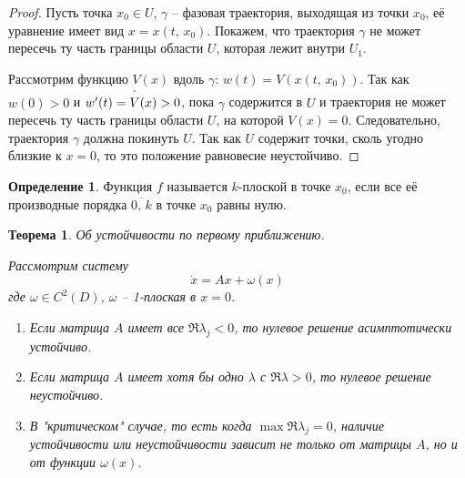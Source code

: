 \documentclass[a4paper,12pt]{article}
\theoremstyle{plain}
\newtheorem{theorem}{Теорема}[section]
\theoremstyle{definition}
\newtheorem{definition}{Определение}[section]
\theoremstyle{remark}
\begin{document}
\begin{proof}
	Пусть точка $x_0 \in  U,\, \gamma$ -- фазовая траектория, выходящая из точки $x_0$, её уравнение имеет вид $x = x(t,\, x_0)$.
	Покажем, что траектория $\gamma$ не может пересечь ту часть границы области $U$, которая лежит внутри $U_1$.

	Рассмотрим функцию $V(x)$ вдоль $\gamma$: $w(t) = V(x(t,\, x_0))$. Так как $w(0) > 0$ и $w'(t) = \overset{`}{V}(x) > 0$, пока $\gamma$ содержится в $U$ и траектория не может пересечь ту часть границы области $U$, на которой $V(x) = 0$. Следовательно, траектория $\gamma$ должна покинуть $U$. Так как $U$ содержит точки, сколь угодно близкие к $x = 0$, то это положение равновесие неустойчиво.
\end{proof}

\begin{definition}
	Функция $f$ называется $k$-плоской в точке $x_0$, если все её производные порядка $\overline{0,\,k}$ в точке $x_0$ равны нулю.
\end{definition}

\begin{theorem}
	Об устойчивости по первому приближению.

	Рассмотрим систему
	\[\dot{x} = Ax + \omega(x)\]
	где $\omega \in C^2(D)$, $\omega$ -- 1-плоская в $x = 0$.

	\begin{enumerate}
		\item Если матрица $A$ имеет все $\Re \lambda_j < 0$, то нулевое решение асимптотически устойчиво.
		\item Если матрица $A$ имеет хотя бы одно $\lambda$ с $\Re \lambda > 0$, то нулевое решение неустойчиво.
		\item В "критическом" случае, то есть когда $\max\Re \lambda_j = 0$, наличие устойчивости или неустойчивости зависит не только от матрицы $A$, но и от функции $\omega(x)$.
	\end{enumerate}
\end{theorem}
\end{document}
